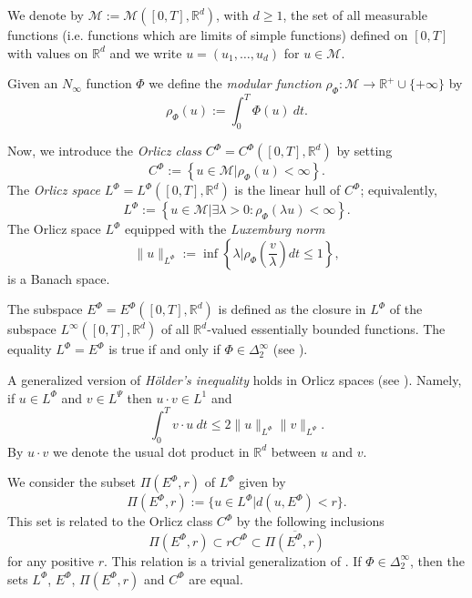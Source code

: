\documentclass[twoside]{article}
\theoremstyle{remark}
\newcommand{\orlnor}{\|_{L^{\Phi}}}
\newcommand{\lphi}{L^{\Phi}}
\newcommand{\lpsi}{L^{\Psi}}
\newcommand{\ephi}{E^{\Phi}}
\newcommand{\claseor}{C^{\Phi}}
\newcommand{\rr}{\mathbb{R}}
\renewcommand{\leq}{\leqslant}
\renewcommand{\geq}{\geqslant}
\begin{document}
 We denote by $\mathcal{M}:=\mathcal{M}\left([0,T],\rr^d\right)$, with $d\geq 1$,  the set of all measurable functions (i.e. functions which are limits of simple functions)  defined on $[0,T]$ with values on $\mathbb{R}^d$ and  we write $u=(u_1,\dots,u_d)$ for  $u\in \mathcal{M}$.

 Given  an $N_{\infty}$ function $\Phi$ we define the \emph{modular function} 
$\rho_{\Phi}:\mathcal{M}\to \mathbb{R}^+\cup\{+\infty\}$ by
\[\rho_{\Phi}(u):= \int_0^T \Phi(u)\ dt.\]

Now, we introduce the \emph{Orlicz class} $C^{\Phi}=C^{\Phi}\left([0,T],\rr^d\right)$   by setting
\begin{equation}\label{claseOrlicz}
  C^{\Phi}:=\left\{u\in \mathcal{M} | \rho_{\Phi}(u)< \infty \right\}.
\end{equation}
The \emph{Orlicz space} $\lphi=L^{\Phi}\left([0,T],\rr^d\right)$ is the linear hull of $\claseor$;
equivalently,
\begin{equation}\label{espacioOrlicz}
\lphi:=\left\{ u\in \mathcal{M}| \exists \lambda>0: \rho_{\Phi}(\lambda u) < \infty   \right\}.
\end{equation}
  The Orlicz space $\lphi$ equipped with the \emph{Luxemburg norm}
\[
\|  u  \orlnor:=\inf \left\{ \lambda\bigg| \rho_{\Phi}\left(\frac{v}{\lambda}\right) dt\leq 1\right\},
\]
is a Banach space. 


The subspace $\ephi=\ephi\left([0,T],\rr^d\right)$ is defined as the closure in $\lphi$ of the subspace $L^{\infty}\left([0,T],\rr^d\right)$ of all $\mathbb{R}^d$-valued essentially bounded functions. The equality $\lphi=\ephi$ is true if and only if $\Phi\in\Delta_2^{\infty}$ (see \cite[Cor. 5.1]{Orliczvectorial2005}). 

A generalized version of \emph{H\"older's inequality} holds in Orlicz spaces (see \cite[Thm. 7.2]{Orliczvectorial2005}). Namely, if $u\in\lphi$ and $v\in\lpsi$ then $u\cdot v\in L^1$ and
\begin{equation}\label{holder}
\int_0^Tv\cdot u\ dt\leq 2 \|u\orlnor\|v\|_{L^{\Psi}}.
\end{equation}
By $u\cdot v$ we denote the usual dot product in $\mathbb{R}^{d}$ between $u$ and $v$.

We consider the subset $\Pi(\ephi,r)$ of $\lphi$ given by
\[\Pi(\ephi,r):=\{u\in\lphi| d(u,\ephi)<r\}.\]
This set is related to the Orlicz class $\claseor$ by the following inclusions
\begin{equation}\label{eq:inclusiones}\Pi(\ephi, r )\subset r \claseor\subset\overline{\Pi(\ephi,r)}
\end{equation}
for any positive $r$. This relation is a trivial generalization of  \cite[Thm. 5.6]{Orliczvectorial2005}.
If $\Phi \in \Delta_2^{\infty}$,  then the sets $\lphi$, $\ephi$, $\Pi(\ephi,r)$ and $\claseor$ are equal.
 
\end{document}
